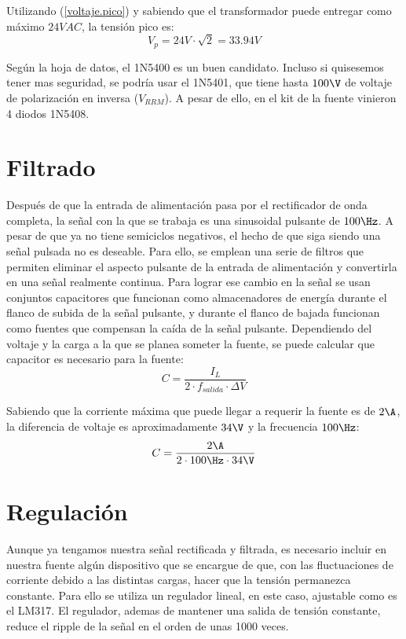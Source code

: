 \documentclass[chaptersright]{informeutn}
\begin{document}
          Utilizando (\ref{voltaje.pico}) y sabiendo que el transformador puede entregar como máximo $24VAC$, la
          tensión pico es:
          \begin{equation*}
            V_p = 24V \cdot \sqrt{2} = 33.94V
          \end{equation*}

          Según la hoja de datos, el 1N5400 es un buen candidato. Incluso si quisesemos tener mas seguridad, se podría
          usar el 1N5401, que tiene hasta $100\V$ de voltaje de polarización en inversa ($V_{RRM}$). A pesar de ello,
          en el kit de la fuente vinieron 4 diodos 1N5408.


      \section{Filtrado}
        Después de que la entrada de alimentación pasa por el rectificador de onda completa, la señal con la que se
        trabaja es una sinusoidal pulsante de $100\Hz$. A pesar de que ya no tiene semiciclos negativos, el hecho de que
        siga siendo una señal pulsada no es deseable. Para ello, se emplean una serie de filtros que permiten eliminar
        el aspecto pulsante de la entrada de alimentación y convertirla en una señal realmente continua. Para lograr
        ese cambio en la señal se usan conjuntos capacitores que funcionan como almacenadores de energía durante el
        flanco de subida de la señal pulsante, y durante el flanco de bajada funcionan como fuentes que compensan
        la caída de la señal pulsante. Dependiendo del voltaje y la carga a la que se planea someter la fuente, se
        puede calcular que capacitor es necesario para la fuente:
        \begin{equation}
            C = \frac{I_{L}}{2 \cdot f_{salida} \cdot \varDelta V}
        \end{equation}

        Sabiendo que la corriente máxima que puede llegar a requerir la fuente es de $2\A$, la diferencia de voltaje
        es aproximadamente $34\V$ y la frecuencia $100\Hz$:
        \begin{equation*}
          C = \frac{2\A}{2 \cdot 100\Hz \cdot 34\V}
        \end{equation*}

      \section{Regulación}
        Aunque ya tengamos nuestra señal rectificada y filtrada, es necesario incluir en nuestra fuente algún
        dispositivo que se encargue de que, con las fluctuaciones de corriente debido a las distintas cargas, hacer que
        la tensión permanezca constante. Para ello se utiliza un regulador lineal, en este caso, ajustable como es el
        LM317. El regulador, ademas de mantener una salida de tensión constante, reduce el ripple de la señal en el
        orden de unas 1000 veces.
\end{document}
